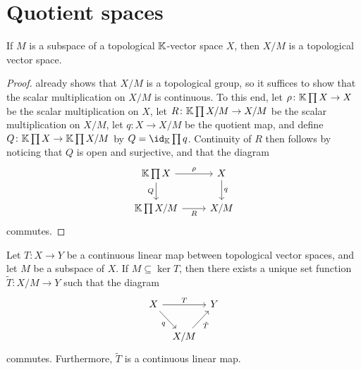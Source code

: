 \documentclass[article, a4paper, 11pt, oneside]{memoir}
\numberwithin{equation}{chapter}
\begin{document}
\section{Quotient spaces}

\begin{theorem}
    If $M$ is a subspace of a topological $\mathbb{K}$-vector space $X$, then $X/M$ is a topological vector space.
\end{theorem}

\begin{proof}
     already shows that $X/M$ is a topological group, so it suffices to show that the scalar multiplication on $X/M$ is continuous. To this end, let $\rho \colon \mathbb{K} \prod X \to X$ be the scalar multiplication on $X$, let $R \colon \mathbb{K} \prod X/M \to X/M$ be the scalar multiplication on $X/M$, let $q \colon X \to X/M$ be the quotient map, and define $Q \colon \mathbb{K} \prod X \to \mathbb{K} \prod X/M$ by $Q = \id_\field \prod q$. Continuity of $R$ then follows by noticing that $Q$ is open and surjective, and that the diagram
    \begin{equation*}
        \begin{tikzcd}
            \field \prod X
                \ar[r, "\rho"]
                \ar[d, "Q", swap]
            & X
                \ar[d, "q"]
            \\
            \field \prod X/M
                \ar[r, "R", swap]
            & X/M
        \end{tikzcd}
    \end{equation*}
    commutes.
\end{proof}


\begin{proposition}
    \label{thm:quotient-space-factorisation}
    Let $T \colon X \to Y$ be a continuous linear map between topological vector spaces, and let $M$ be a subspace of $X$. If $M \subseteq \ker T$, then there exists a unique set function $\tilde{T} \colon X/M \to Y$ such that the diagram
    \begin{equation*}
        \begin{tikzcd}[column sep=tiny]
            X
                \ar[rr, "T"]
                \ar[dr, "q", swap]
            && Y
            \\
            & X/M
                \ar[ur, "\tilde{T}", swap]
        \end{tikzcd}
    \end{equation*}
    commutes. Furthermore, $\tilde{T}$ is a continuous linear map.
\end{proposition}
\end{document}
